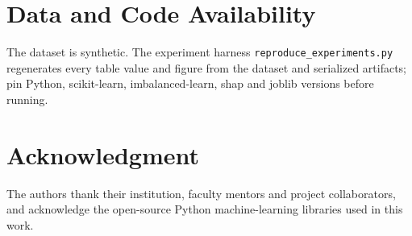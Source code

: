 \documentclass[conference]{IEEEtran}
\begin{document}
\section*{Data and Code Availability}
The dataset is synthetic. The experiment harness \texttt{reproduce\_\allowbreak{}experiments.py} regenerates every table value and figure from the dataset and serialized artifacts; pin Python, scikit-learn, imbalanced-learn, shap and joblib versions before running.

\section*{Acknowledgment}
The authors thank their institution, faculty mentors and project collaborators, and acknowledge the open-source Python machine-learning libraries used in this work.

\appendices
\end{document}
